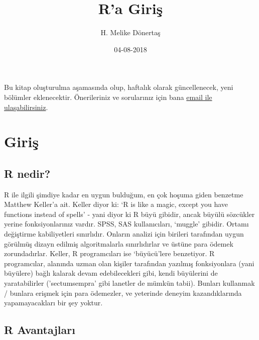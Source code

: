 \documentclass[]{book}
\title{R'a Giriş}
\author{H. Melike Dönertaş}
\date{04-08-2018}
\begin{document}
\maketitle

{
\setcounter{tocdepth}{1}
\tableofcontents
}
\hypertarget{section}{%
\chapter*{}\label{section}}

Bu kitap oluşturulma aşamasında olup, haftalık olarak güncellenecek,
yeni bölümler eklenecektir. Önerileriniz ve sorularınız için bana
\href{mailto:donertas.melike@gmail.com}{email ile ulaşabilirsiniz}.

\hypertarget{Giris}{%
\chapter{Giriş}\label{Giris}}

\hypertarget{r-nedir}{%
\section{R nedir?}\label{r-nedir}}

R ile ilgili şimdiye kadar en uygun bulduğum, en çok hoşuma giden
benzetme Matthew Keller'a ait. Keller diyor ki: `R is like a magic,
except you have functions instead of spells' - yani diyor ki R büyü
gibidir, ancak büyülü sözcükler yerine fonksiyonlarınız vardır. SPSS,
SAS kullanıcıları, `muggle' gibidir. Ortamı değiştirme kabiliyetleri
sınırlıdır. Onların analizi için birileri tarafından uygun görülmüş
dizayn edilmiş algoritmalarla sınırlıdırlar ve üstüne para ödemek
zorundadırlar. Keller, R programcıları ise `büyücü'lere benzetiyor. R
programcılar, alanında uzman olan kişiler tarafından yazılmış
fonksiyonlara (yani büyülere) bağlı kalarak devam edebilecekleri gibi,
kendi büyülerini de yaratabilirler ('sectumsempra' gibi lanetler de
mümkün tabii). Bunları kullanmak / bunlara erişmek için para ödemezler,
ve yeterinde deneyim kazandıklarında yapamayacakları bir şey yoktur.

\hypertarget{r-avantajlar}{%
\section{R Avantajları}\label{r-avantajlar}}
\end{document}
